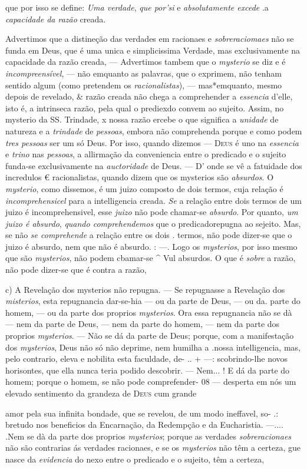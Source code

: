 que por isso se define: \emph{Uma verdade}, \emph{que por'si} e \emph{absolutamente excede} .a \emph{capacidade da razão} creada.\par Advertimos que a distineção das verdades em racionaes e \emph{sobreraciomaes} não se funda em Deus, que é uma unica e simplicissima Verdade, mas exclusivamente na capacidade da razão creada, --- Advertimos tambem que o \emph{mysterio} se diz e é \emph{incompreensível}, --- não emquanto as palavras, que o exprimem, não tenham sentido algum (como pretendem os \emph{racionalistas}), --- mas*emquanto, mesmo depois de revelado, \& razão creada não chega a comprehender a \emph{essencia} d'elle, isto é, a intrinseca razão, pela qual o prediexdo convem ao sujeito. Assim, no mysterio da SS. Trindade, x nossa razão ercebe o que significa a \emph{unidade} de natureza e a \emph{trindade} de \emph{pessoas}, embora não comprehenda porque e como podem \emph{tres pessoas} ser um só Deus. Por isso, quando dizemos --- \textsc{Deus} é uno na \emph{essencia} e \emph{trino} nas \emph{pessoas}, a allirmação da conveniencia entre o predicado e o sujeito funda-se exclusivamente na \emph{auctoridade} de Deus. --- D' onde se vê a fatuidade dos incredulos € racionalistas, quando dizem que os mysterios são \emph{absurdos}. O \emph{mysterio}, como dissemos, é um juizo composto de dois termos, cuja relação é \emph{incomprehensicel} para a intelligencia creada. \emph{Se} a relação entre dois termos de um juizo é incomprehensivel, esse \emph{juizo} não pode chamar-se \emph{absurdo}. Por quanto, \emph{um juizo é absurdo}, \emph{quando comprehendemos} que o predicadorepugna ao sejeito. Mas, se não \emph{se comprehende} a relação entre os dois . termos, não pode dizer-se que o juizo é absurdo, nem que não é absurdo. : ---. Logo os \emph{mysterios}, por isso mesmo que são \emph{mysterios}, não podem cbamar-se \textasciicircum{} Vul absurdos. O que é \emph{sobre} a razão, não pode dizer-se que é contra a razão,\par c) A Revelação dos mysterios não repugna. --- Se repugnasse a Revelação dos \emph{misterios}, esta repugnancia dar-se-hia --- ou da parte de Deus, --- ou da. parte do homem, --- ou da parte dos proprios \emph{mysterios}. Ora essa repugnancia não se dà --- nem da parte de Deus, --- nem da parte do homem, --- nem da parte dos proprios \emph{mysterios}. --- Não se dá da parte de Deus; porque, com a manifestação dos \emph{mysterios}, Deus não só não deprime, nem humilha a .nossa intelligencia, mas, pelo contrario, eleva e nobilita esta faculdade, de- .. + ---: scobrindo-lhe novos horisontes, que ella nunca teria podido descobrir. --- Nem... ! E dá da parte do homem; porque o homem, se não pode comprefender- 08 --- desperta em nós um elevado sentimento da grandeza de \textsc{Deus} cum grande\par amor pela sua infinita bondade, que se revelou, de um modo ineffavel, so- .: bretudo nos beneficios da Encarnação, da Redempção e da Eucharistia. ---.... .Nem se dà da parte dos proprios \emph{mysterios}; porque as verdades \emph{sobreracionaes} não são contrarias ás verdades racionaes, e se os \emph{mysterios} não têm a certeza, gue nasce da \emph{evidencia} do nexo entre o predicado e o sujeito, têm a certeza, 